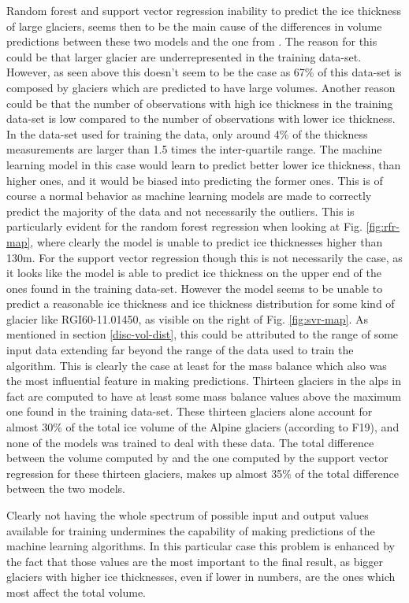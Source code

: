 Random forest and support vector regression inability to predict the ice thickness of large glaciers, seems then to be the main cause of the differences in volume predictions between these two models and the one from \citet{Farinotti2019}.
The reason for this could be that larger glacier are underrepresented in the training data-set. However, as seen above this doesn't seem to be the case as 67\% of this data-set is composed by glaciers which are predicted to have large volumes.
Another reason could be that the number of observations with high ice thickness in the training data-set is low compared to the number of observations with lower ice thickness. In the data-set used for training the data, only around 4\% of the thickness measurements are larger than 1.5 times the inter-quartile range. The machine learning model in this case would learn to predict better lower ice thickness, than higher ones, and it would be biased into predicting the former ones. This is of course a normal behavior as machine learning models are made to correctly predict the majority of the data and not necessarily the outliers. This is particularly evident for the random forest regression when looking at Fig. \ref{fig:rfr-map}, where clearly the model is unable to predict ice thicknesses higher than 130m.
For the support vector regression though this is not necessarily the case, as it looks like the model is able to predict ice thickness on the upper end of the ones found in the training data-set. However the model seems to be unable to predict a reasonable ice thickness and ice thickness distribution for some kind of glacier like RGI60-11.01450, as visible on the right of Fig. \ref{fig:svr-map}. As mentioned in section \ref{disc-vol-dist}, this could be attributed to the range of some input data extending far beyond the range of the data used to train the algorithm. This is clearly the case at least for the mass balance which also was the most influential feature in making predictions. Thirteen glaciers in the alps in fact are computed to have at least some mass balance values above the maximum one found in the training data-set. These thirteen glaciers alone account for almost 30\% of the total ice volume of the Alpine glaciers (according to F19), and none of the models was trained to deal with these data. The total difference between the volume computed by \citet{Farinotti2019} and the one computed by the support vector regression for these thirteen glaciers, makes up almost 35\% of the total difference between the two models.
 
Clearly not having the whole spectrum of possible input and output values available for training undermines the capability of making predictions of the machine learning algorithms. In this particular case this problem is enhanced by the fact that those values are the most important to the final result, as bigger glaciers with higher ice thicknesses, even if lower in numbers, are the ones which most affect the total volume. 


